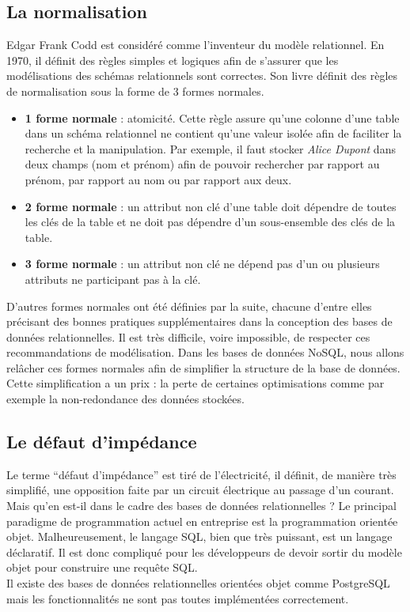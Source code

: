 \subsection{La normalisation}

    Edgar Frank Codd est considéré comme l'inventeur du modèle relationnel. En 1970, il définit des règles simples et logiques afin de s'assurer que les modélisations des schémas relationnels sont correctes\cite{Wikipedia_Edgar_Frank_Codd}. Son livre définit des règles de normalisation sous la forme de 3 formes normales.
    \vspace{10px}
    \begin{itemize}
      \item \textbf{1\iere{} forme normale} : atomicité. Cette règle assure qu'une colonne d'une table dans un schéma relationnel ne contient qu'une valeur isolée afin de faciliter la recherche et la manipulation. Par exemple, il faut stocker \textit{Alice Dupont} dans deux champs (nom et prénom) afin de pouvoir rechercher par rapport au prénom, par rapport au nom ou par rapport aux deux.
      \item \textbf{2\ieme{} forme normale} : un attribut non clé d'une table doit dépendre de toutes les clés de la table et ne doit pas dépendre d'un sous-ensemble des clés de la table.
      \item \textbf{3\ieme{} forme normale} : un attribut non clé ne dépend pas d'un ou plusieurs attributs ne participant pas à la clé.
    \end{itemize}
    \vspace{20px}
    D'autres formes normales ont été définies par la suite, chacune d'entre elles précisant des bonnes pratiques supplémentaires dans la conception des bases de données relationnelles. Il est très difficile, voire impossible, de respecter ces recommandations de modélisation. Dans les bases de données NoSQL, nous allons relâcher ces formes normales afin de simplifier la structure de la base de données. Cette simplification a un prix : la perte de certaines optimisations comme par exemple la non-redondance des données stockées.

\subsection{Le défaut d'impédance}

  Le terme \enquote{défaut d'impédance} est tiré de l'électricité, il définit, de manière très simplifié, une opposition faite par un circuit électrique au passage d'un courant. Mais qu'en est-il dans le cadre des bases de données relationnelles ? Le principal paradigme de programmation actuel en entreprise est la programmation orientée objet. Malheureusement, le langage SQL, bien que très puissant, est un langage déclaratif. Il est donc compliqué pour les développeurs de devoir sortir du modèle objet pour construire une requête SQL.\\ Il existe des bases de données relationnelles orientées objet comme PostgreSQL mais les fonctionnalités ne sont pas toutes implémentées correctement.

